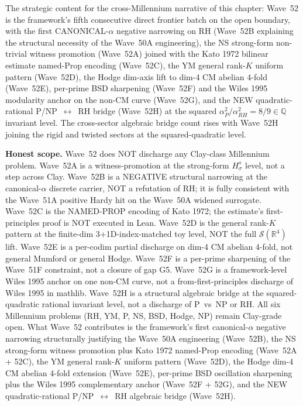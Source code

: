 \begin{remark}
The strategic content for the cross-Millennium narrative of this chapter: Wave~52 is the framework's fifth consecutive direct frontier batch on the open boundary, with the first CANONICAL-$\alpha$ negative narrowing on RH (Wave~52B explaining the structural necessity of the Wave~50A engineering), the NS strong-form non-trivial witness promotion (Wave~52A) joined with the Kato 1972 bilinear estimate named-Prop encoding (Wave~52C), the YM general rank-$K$ uniform pattern (Wave~52D), the Hodge dim-axis lift to dim-4 CM abelian 4-fold (Wave~52E), per-prime BSD sharpening (Wave~52F) and the Wiles 1995 modularity anchor on the non-CM curve (Wave~52G), and the NEW quadratic-rational P/NP~$\leftrightarrow$~RH bridge (Wave~52H) at the squared $\alpha_P^2 / \alpha_{RH}^2 = 8/9 \in \mathbb{Q}$ invariant level. The cross-sector algebraic bridge count rises with Wave~52H joining the rigid and twisted sectors at the squared-quadratic level.

\textbf{Honest scope.} Wave~52 does NOT discharge any Clay-class Millennium problem. Wave~52A is a witness-promotion at the strong-form $H^s_\sigma$ level, not a step across Clay. Wave~52B is a NEGATIVE structural narrowing at the canonical-$\alpha$ discrete carrier, NOT a refutation of RH; it is fully consistent with the Wave~51A positive Hardy hit on the Wave~50A widened surrogate. Wave~52C is the NAMED-PROP encoding of Kato 1972; the estimate's first-principles proof is NOT executed in Lean. Wave~52D is the general rank-$K$ pattern at the finite-dim 3+1D-index-matched toy level, NOT the full $\mathcal{S}(\mathbb{R}^4)$ lift. Wave~52E is a per-codim partial discharge on dim-4 CM abelian 4-fold, not general Mumford or general Hodge. Wave~52F is a per-prime sharpening of the Wave~51F constraint, not a closure of gap G5. Wave~52G is a framework-level Wiles 1995 anchor on one non-CM curve, not a from-first-principles discharge of Wiles 1995 in mathlib. Wave~52H is a structural algebraic bridge at the squared-quadratic rational invariant level, not a discharge of P~vs~NP or RH. All six Millennium problems (RH, YM, P, NS, BSD, Hodge, NP) remain Clay-grade open. What Wave~52 contributes is the framework's first canonical-$\alpha$ negative narrowing structurally justifying the Wave~50A engineering (Wave~52B), the NS strong-form witness promotion plus Kato 1972 named-Prop encoding (Wave~52A + 52C), the YM general rank-$K$ uniform pattern (Wave~52D), the Hodge dim-4 CM abelian 4-fold extension (Wave~52E), per-prime BSD oscillation sharpening plus the Wiles 1995 complementary anchor (Wave~52F + 52G), and the NEW quadratic-rational P/NP~$\leftrightarrow$~RH algebraic bridge (Wave~52H).
\end{remark}

